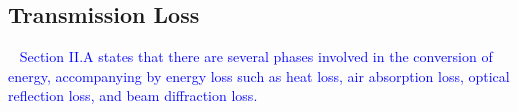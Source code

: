 \documentclass{IEEEtran}
\begin{document}
\subsection{Transmission Loss}\
\textcolor{blue}{Section II.A states that there are several phases involved in the conversion of energy, accompanying by energy loss such as heat loss, air absorption loss, optical reflection loss, and beam diffraction loss.} %
\end{document}
